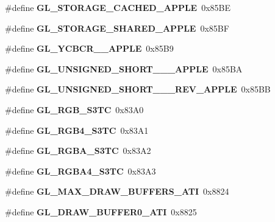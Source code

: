 \begin{DoxyCompactItemize}
\item 
\#define {\bfseries G\+L\+\_\+\+S\+T\+O\+R\+A\+G\+E\+\_\+\+C\+A\+C\+H\+E\+D\+\_\+\+A\+P\+P\+L\+E}~0x85\+B\+E\label{_s_d_l__opengl_8h_a90d485c73018097d46f0ba8046ed9020}

\item 
\#define {\bfseries G\+L\+\_\+\+S\+T\+O\+R\+A\+G\+E\+\_\+\+S\+H\+A\+R\+E\+D\+\_\+\+A\+P\+P\+L\+E}~0x85\+B\+F\label{_s_d_l__opengl_8h_ae3cb8456fa7098889c154bb688b01d42}

\item 
\#define {\bfseries G\+L\+\_\+\+Y\+C\+B\+C\+R\+\_\+\_\+\+A\+P\+P\+L\+E}~0x85\+B9\label{_s_d_l__opengl_8h_afe87839802db199a51e631973ce4b372}

\item 
\#define {\bfseries G\+L\+\_\+\+U\+N\+S\+I\+G\+N\+E\+D\+\_\+\+S\+H\+O\+R\+T\+\_\+\_\+\_\+\+A\+P\+P\+L\+E}~0x85\+B\+A\label{_s_d_l__opengl_8h_a47e947dccaaa6226f8bbbbffff8f2348}

\item 
\#define {\bfseries G\+L\+\_\+\+U\+N\+S\+I\+G\+N\+E\+D\+\_\+\+S\+H\+O\+R\+T\+\_\+\_\+\_\+\+R\+E\+V\+\_\+\+A\+P\+P\+L\+E}~0x85\+B\+B\label{_s_d_l__opengl_8h_ad15f8255cc6948b1a479c44f5a27a904}

\item 
\#define {\bfseries G\+L\+\_\+\+R\+G\+B\+\_\+\+S3\+T\+C}~0x83\+A0\label{_s_d_l__opengl_8h_a826cb6cedeae03e7e5c53d7700524dac}

\item 
\#define {\bfseries G\+L\+\_\+\+R\+G\+B4\+\_\+\+S3\+T\+C}~0x83\+A1\label{_s_d_l__opengl_8h_ad7fc8ca0fb65379a1874c2b5a4620f6f}

\item 
\#define {\bfseries G\+L\+\_\+\+R\+G\+B\+A\+\_\+\+S3\+T\+C}~0x83\+A2\label{_s_d_l__opengl_8h_a4232f53d827219c560c108d801e4fd95}

\item 
\#define {\bfseries G\+L\+\_\+\+R\+G\+B\+A4\+\_\+\+S3\+T\+C}~0x83\+A3\label{_s_d_l__opengl_8h_a74c46641ddd450321a197c8f7626407f}

\item 
\#define {\bfseries G\+L\+\_\+\+M\+A\+X\+\_\+\+D\+R\+A\+W\+\_\+\+B\+U\+F\+F\+E\+R\+S\+\_\+\+A\+T\+I}~0x8824\label{_s_d_l__opengl_8h_a171e71b9241a9fe8a8b6250b2fae0bac}

\item 
\#define {\bfseries G\+L\+\_\+\+D\+R\+A\+W\+\_\+\+B\+U\+F\+F\+E\+R0\+\_\+\+A\+T\+I}~0x8825\label{_s_d_l__opengl_8h_a59a80fbfd8b46b620efacbbdb96ed01c}


\end{DoxyCompactItemize}
